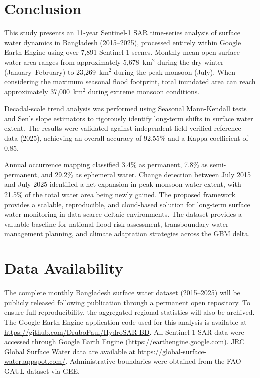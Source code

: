 \documentclass[fleqn,10pt]{article}
\begin{document}
\section{Conclusion}

This study presents an 11-year Sentinel-1 SAR time-series analysis of surface water dynamics in Bangladesh (2015--2025), processed entirely within Google Earth Engine using over 7,891 Sentinel-1 scenes. Monthly mean open surface water area ranges from approximately 5,678~km$^2$ during the dry winter (January--February) to 23,269~km$^2$ during the peak monsoon (July). When considering the maximum seasonal flood footprint, total inundated area can reach approximately 37,000~km$^2$ during extreme monsoon conditions.

Decadal-scale trend analysis was performed using Seasonal Mann-Kendall tests and Sen's slope estimators to rigorously identify long-term shifts in surface water extent. The results were validated against independent field-verified reference data (2025), achieving an overall accuracy of 92.55\% and a Kappa coefficient of 0.85.

Annual occurrence mapping classified 3.4\% as permanent, 7.8\% as semi-permanent, and 29.2\% as ephemeral water. Change detection between July 2015 and July 2025 identified a net expansion in peak monsoon water extent, with 21.5\% of the total water area being newly gained. The proposed framework provides a scalable, reproducible, and cloud-based solution for long-term surface water monitoring in data-scarce deltaic environments. The dataset provides a valuable baseline for national flood risk assessment, transboundary water management planning, and climate adaptation strategies across the GBM delta.


\section*{Data Availability}
The complete monthly Bangladesh surface water dataset (2015--2025) will be publicly released following publication through a permanent open repository. To ensure full reproducibility, the aggregated regional statistics will also be archived. The Google Earth Engine application code used for this analysis is available at \url{https://github.com/DruboPaul/HydroSAR-BD}. All Sentinel-1 SAR data were accessed through Google Earth Engine (\url{https://earthengine.google.com}). JRC Global Surface Water data are available at \url{https://global-surface-water.appspot.com/}. Administrative boundaries were obtained from the FAO GAUL dataset via GEE.
\end{document}
